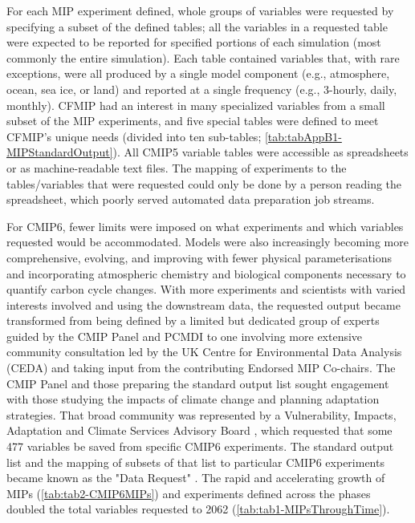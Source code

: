 \documentclass[manuscript]{copernicus}
\begin{document}
For each MIP experiment defined, whole groups of variables were requested by specifying a subset of the defined tables; all the variables in a requested table were expected to be reported for specified portions of each simulation (most commonly the entire simulation). Each table contained variables that, with rare exceptions, were all produced by a single model component (e.g., atmosphere, ocean, sea ice, or land) and reported at a single frequency (e.g., 3-hourly, daily, monthly). CFMIP had an interest in many specialized variables from a small subset of the MIP experiments, and five special tables were defined to meet CFMIP's unique needs (divided into ten sub-tables; \autoref{tab:tabAppB1-MIPStandardOutput}). All CMIP5 variable tables were accessible as spreadsheets or as machine-readable text files. The mapping of experiments to the tables/variables that were requested could only be done by a person reading the spreadsheet, which poorly served automated data preparation job streams.

For CMIP6, fewer limits were imposed on what experiments and which variables requested would be accommodated. Models were also increasingly becoming more comprehensive, evolving, and improving with fewer physical parameterisations and incorporating atmospheric chemistry and biological components necessary to quantify carbon cycle changes. With more experiments and scientists with varied interests involved and using the downstream data, the requested output became transformed from being defined by a limited but dedicated group of experts guided by the CMIP Panel and PCMDI to one involving more extensive community consultation led by the UK Centre for Environmental Data Analysis (CEDA) and taking input from the contributing Endorsed MIP Co-chairs. The CMIP Panel and those preparing the standard output list sought engagement with those studying the impacts of climate change and planning adaptation strategies. That broad community was represented by a Vulnerability, Impacts, Adaptation and Climate Services Advisory Board \citep[VIACS AB;][]{ruane_vulnerability_2016}, which requested that some 477 variables be saved from specific CMIP6 experiments. The standard output list and the mapping of subsets of that list to particular CMIP6 experiments became known as the "Data Request" \citep{juckes_cmip6_2020}. The rapid and accelerating growth of MIPs (\autoref{tab:tab2-CMIP6MIPs}) and experiments defined across the phases doubled the total variables requested to 2062 (\autoref{tab:tab1-MIPsThroughTime}). 
\end{document}
